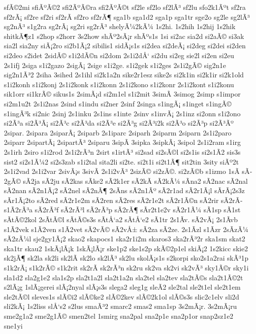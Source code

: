 {sfÃ©2mi
sfiÃºÃ©2
sfi2ÃºÃ©ra
sfi2ÃºÃ©t
sf2le
sf2lo
sf2lÃ³
sf2lu
sfo2k1Ãºt
sf2ra
sf2rÃ¡
sf2re
sf2ri
sf2rÃ­
sf2ro
sf2rÃ¶
sga1b
sga1d2
sga1p
sga1tr
sge2o
sg2le
sg2lÃ³
sg2nÃ³
s1g2ra
sg2rÃ¡
sg2ri
sg2rÃ³
shelyÃ¼2kÃ¼
1s2hi.
1s2hih
1s2hij
1s2hik
shitkÃ¶z1
s2hop
s2horr
3s2how
shÃº2sÃ¡r
shÃºs1s
1si
si2ac
sia2d
si2aÃ©
si3ak
sia2l
sia2ny
siÃ¡2ro
si2b1Ã¡2
sibilis1
sidÃ¡s1s
si2dea
si2deÃ¡
si2deg
si2dei
si2den
si2deo
s2idet
2sidÃ©
s1i2dÃ©n
si2dom
2s1i2dÅ‘
si2du
si2eg
sie2l
si2en
si2eu
2s1ifj
2siga
s1i2gazo
2sigÃ¡
2sige
s1i2ge.
s1i2gek
s1i2ges
2s1i2gÃ©
sig2n1e
sig2n1Ã³2
2siha
3sihed
2s1ihl
si2k1a2n
sike2r1esz
sike2s
si2k1in
si2k1ir
si2k1old
s1i2konh
s1i2konj
2s1i2konk
s1i2konn
2s1i2kono
s1i2konr
2s1i2kont
s1i2konu
sik1orr
si1krÃ©
sikus1s
2simÃ¡d
si2m1el
s1i2mit
3simÃ­
3simog
2simp
s1impor
si2m1u2t
2s1i2nas
2sind
s1indu
si2ner
2sinf
2singa
s1ingÃ¡
s1inget
s1ingÃ©
s1ingÃ³k
si2nic
2sinj
2s1inku
2s1ins
s1inte
2sinv
s1invÃ¡
2s1inz
si2onn
s1i2ono
si2Ã³a
si2Ã³Ã¡
si2Ã³c
si2Ã³da
si2Ã³e
si2Ã³g
si2Ã³i2k
si2Ã³o
si2Ã³p
si2Ã³Ãº
2sipar.
2sipara
2siparÃ¡
2siparb
2s1iparc
2siparh
2siparm
2siparn
2s1i2paro
2siparr
2sipartÃ¡
2sipartÃ³
2siparu
3sipÃ­
3sipka
3sipkÃ¡
3sipol
2s1i2ram
s1irg
2s1irh
2siro
s1i2rod
2s1i2rÃ³n
2sirt
s1irtÃ³
si2sad
si2sÃ©l
si2s1is
si2s1Ã­2
sis3s
sist2
si2s1Ã¼2
si2s3zab
s1i2tal
sita2li
si2te.
si2t1i
si2t1Ã¶
sit2tin
3sity
siÃº2t
2s1i2vad
2s1i2var
2sivÃ¡s
3sivÃ­
2s1i2vÃ³
2sizÃ©
si2zÃ©.
si2zÃ©b
s1izmo
1sÃ­
sÃ­2gÃ©
sÃ­2ja
sÃ­2ju
sÃ­2kas
sÃ­ke2
sÃ­2k1er
sÃ­2kÃ­
sÃ­2kÃ¼
sÃ­na2
sÃ­2nac
sÃ­2nal
sÃ­2nan
sÃ­2n1Ã¡2
sÃ­2nel
sÃ­2nÃ¶
2sÃ­ns
sÃ­2n1Ãº
sÃ­2r1ad
sÃ­2r1Ã¡l
sÃ­rÃ¡2s3z
sÃ­r1Ã¡2to
sÃ­2red
sÃ­2r1e2m
sÃ­2ren
sÃ­2res
sÃ­2r1e2t
sÃ­2r1Ã©n
sÃ­2rir
sÃ­2rÃ­
s1Ã­2rÃ³a
sÃ­2rÃ³f
sÃ­2rÃ³l
sÃ­2rÃ³p
sÃ­2rÃ¶
sÃ­r2t1e2v
sÃ­2r1Ã¼
sÃ­1sp
sÃ­1st
sÃ­tÃ©2kol
2sÃ­tÃ©l
sÃ­tÃ©s3s
sÃ­tÅ‘a2
sÃ­tÅ‘e2
sÃ­1tr
2s1Ã­v.
sÃ­2vÃ¡
2s1Ã­vb
s1Ã­2vek
s1Ã­2ven
s1Ã­2vet
sÃ­2vÃ©
sÃ­2vÅ±
sÃ­2za
sÃ­2ze.
2s1Ã­zl
s1Ã­zr
2sÃ­zÃ¼
sÃ­2zÃ¼l
sje2gy1Ã¡2
skao2
skapocs1
ska2r1i2m
skaros3
ska2rÃ³2r
ska1sm
skat2
ska1tr
skau2
1skÃ¡lÃ¡k
1skÃ¡lÃ¡r
ske1p2
ske1s2p
skÃ©2p1el
skiÃ¡2
1s2kicc
skie2
sk2jÃ¶
sk2la
sk2li
sk2lÃ­
sk2lo
sk2lÃ³
sk2lu
skolÃ¡s1s
s2korpi
sko2s1a2rai
skÃ³1p
s1k2rÃ¡
s1k2rÃ©
s1k2rit
sk2rÃ­
sk2rÃ³n
sk2ru
sk2va
sk2vi
sk2vÃ³
sky1Ã©r
sky1i
sla1d2
sla2g1e2
sla1s2p
sla2t1a2l
sla2t1a2n
sla2tel
sla2tev
sla2tÃ©s
sla2t1Ã©2t
s2lÃ¡g
1slÃ¡gerei
slÃ¡2nyal
slÃ¡s3s
slega2
sleg1g
sleÃ­2
sle2tal
sle2t1el
sle2t1em
sle2tÃ©l
sleves1s
slÃ©i2
slÃ©ke2
slÃ©2kev
slÃ©2k1ol
slÃ©s3s
slic2c1elv
sli2d
sli2kÃ¡
1s2liss
slÅ‘s2
s2lus
smaÃ³2
smarc2
smas2
sma1sp
3s2mÃ¡r.
3s2mÃ¡ru
sme2g1a2
sme2g1Ã©
smen2tel
1smirg
sna2pal
sna2p1e
sna2p1or
snap2sz1e2
sne1yi
}

